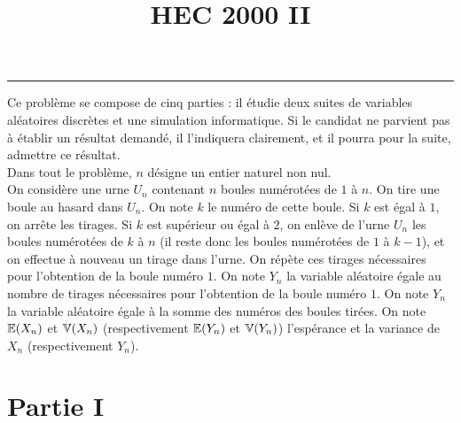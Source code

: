 \documentclass[11pt]{article}%
\title{\bf \vspace{-1cm} HEC 2000 II} %
\author{} %
\date{} %
\begin{document}
\maketitle %
\vspace{-1.2cm}\hrule %
\thispagestyle{fancy}

\vspace*{.4cm}

\noindent
Ce problème se compose de cinq parties : il étudie deux suites de 
variables aléatoires discrètes et une simulation informatique. Si le 
candidat ne parvient pas à établir un résultat demandé, il l'indiquera 
clairement, et il pourra pour la suite, admettre ce résultat.\\
Dans tout le problème, $n$ désigne un entier naturel non nul.\\
On considère une urne $U_n$ contenant $n$ boules numérotées de $1$ à 
$n$. On tire une boule au hasard dans $U_n$. On note $k$ le numéro de 
cette boule. Si $k$ est égal à $1$, on arrête les tirages. Si $k$ est 
supérieur ou égal à $2$, on enlève de l'urne $U_n$ les boules 
numérotées de $k$ à $n$ (il reste donc les boules numérotées de $1$ à 
$k-1$), et on effectue à nouveau un tirage dans l'urne. On répète ces 
tirages nécessaires pour l'obtention de la boule numéro $1$. On note 
$Y_n$ la variable aléatoire égale au nombre de tirages nécessaires pour 
l'obtention de la boule numéro $1$. On note $Y_n$ la variable aléatoire 
égale à la somme des numéros des boules tirées. On note $\mathbb{E}(X_n)$ et 
$\mathbb{V}(X_n)$ (respectivement $\mathbb{E}(Y_n)$ et $\mathbb{V}(Y_n)$) l'espérance et la 
variance de $X_n$ (respectivement $Y_n$).

\section*{Partie I}
\end{document}
